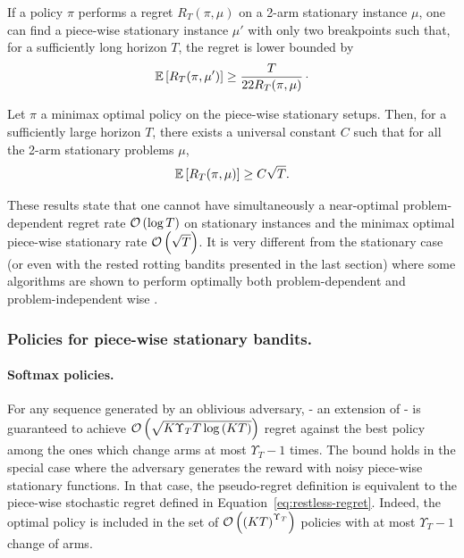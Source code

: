 \begin{proposition}
\label{prop:garivier-lb}
If a policy $\pi$ performs a regret $R_T(\pi, \mu)$ on a 2-arm stationary instance $\mu$, one can find a piece-wise stationary instance $\mu'$ with only two breakpoints such that, for a sufficiently long horizon $T$, the regret is lower bounded by 
\[\mathbb{E}\left[R_T(\pi, \mu')\right] \geq \frac{T}{22R_T(\pi, \mu)}\,\cdot\]  
\end{proposition}

\begin{corollary}
\label{cor:garivier-lb}
Let $\pi$ a minimax optimal policy on the piece-wise stationary setups. Then, for a sufficiently large horizon $T$, there exists a universal constant $C$ such that for all the 2-arm stationary problems $\mu$, 
\[
\mathbb{E}\left[R_T(\pi,\mu)\right] \geq C\sqrt{T}.
\]
\end{corollary}

These results state that one cannot have simultaneously a near-optimal problem-dependent regret rate $\mathcal{O}\left(\log{T}\right)$ on stationary instances and the minimax optimal piece-wise stationary rate $\mathcal{O}\left(\sqrt{T}\right)$. It is very different from the stationary case (or even with the rested rotting bandits presented in the last section) where some algorithms are shown to perform optimally both problem-dependent and problem-independent wise \citep{lattimore2018refining, menard2017klucb++}.

\subsubsection{Policies for piece-wise stationary bandits.}
\paragraph{Softmax policies.} For any sequence generated by an oblivious adversary, \EXPS \citep{auer2002nonstochastic} - an extension of \EXP - is guaranteed to achieve $\mathcal{O}\left(\sqrt{K\Upsilon_T T\log\left(KT\right)}\right)$ regret against the best policy among the ones which change arms at most $\Upsilon_T -1$ times. The bound holds in the special case where the adversary generates the reward with noisy piece-wise stationary functions. In that case, the pseudo-regret definition is equivalent to the piece-wise stochastic regret defined in Equation~\ref{eq:restless-regret}. Indeed, the optimal policy is included in the set of $\mathcal{O}\left(\left(KT\right)^{\Upsilon_T}\right)$ policies with at most $\Upsilon_T-1$ change of arms. 

